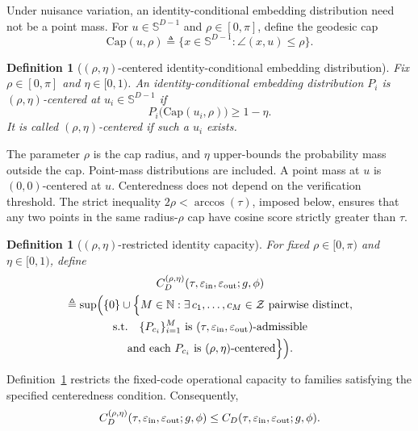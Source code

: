 \documentclass[journal]{IEEEtran}
\newtheorem{definition}[theorem]{Definition}
\begin{document}
\begin{bibunit}
Under nuisance variation, an identity-conditional embedding distribution need not be a point mass. For $u\in\mathbb S^{D-1}$ and $\rho\in[0,\pi]$, define the geodesic cap
%
\begin{equation}
\mathrm{Cap}(u,\rho) \triangleq \{x\in\mathbb S^{D-1}:\angle(x,u)\le \rho\}.
\label{eq:cap_definition_main}
\end{equation}


\begin{definition}[$(\rho,\eta)$-centered identity-conditional embedding distribution]
\label{def:centered_identity_distribution_main}
%
Fix $\rho\in[0,\pi]$ and $\eta\in[0,1)$. An identity-conditional embedding distribution $P_i$ is \textit{$(\rho,\eta)$-centered at} $u_i\in\mathbb S^{D-1}$ if
%
\begin{equation}
P_i\bigl(\mathrm{Cap}(u_i,\rho)\bigr)\ge 1-\eta.
\label{eq:centered_identity_condition_main}
\end{equation}
%
It is called \textit{$(\rho,\eta)$-centered} if such a $u_i$ exists.
%
\end{definition}

The parameter $\rho$ is the cap radius, and $\eta$ upper-bounds the probability mass outside the cap. Point-mass distributions are included. A point mass at $u$ is $(0,0)$-centered at $u$. Centeredness does not depend on the verification threshold. The strict inequality $2\rho<\arccos(\tau)$, imposed below, ensures that any two points in the same radius-$\rho$ cap have cosine score strictly greater than $\tau$.

\begin{definition}[$(\rho,\eta)$-restricted identity capacity]
\label{def:restricted_capacity_main}
%
For fixed $\rho\in[0,\pi)$ and $\eta\in[0,1)$, define
%
\begin{multline}
C_D^{(\rho,\eta)} (\tau,\varepsilon_{\rm in},\varepsilon_{\rm out};g,\phi)\\
\triangleq \sup\Bigl(\{0\}\cup\Bigl\{ M\in\mathbb N: \exists\,c_1,\ldots,c_M\in\mathcal Z
\text{ pairwise distinct},\\
\text{s.t.}\quad
\{P_{c_i}\}_{i=1}^M
\text{ is }
(\tau,\varepsilon_{\rm in},\varepsilon_{\rm out})\text{-admissible}\\
\text{and each }P_{c_i}\text{ is }(\rho,\eta)\text{-centered}
\Bigr\}\Bigr).
\label{eq:restricted_capacity_definition_main}
\end{multline}
%
\end{definition}


Definition~\ref{def:restricted_capacity_main} restricts the fixed-code operational capacity to families satisfying the specified centeredness condition. Consequently,
%
\begin{equation}
C_D^{(\rho,\eta)} (\tau,\varepsilon_{\rm in},\varepsilon_{\rm out};g,\phi)
\le C_D(\tau,\varepsilon_{\rm in},\varepsilon_{\rm out};g,\phi).
\label{eq:restricted_le_general_main}
\end{equation}


\end{bibunit}
\end{document}
